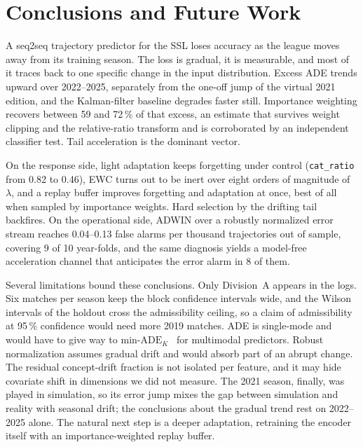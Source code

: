 \documentclass[conference]{IEEEtran}
\begin{document}
\section{Conclusions and Future Work}
\label{sec:conclusion}

A seq2seq trajectory predictor for the SSL loses accuracy as the league moves
away from its training season. The loss is gradual, it is measurable, and most
of it traces back to one specific change in the input distribution. Excess ADE
trends upward over 2022--2025, separately from the one-off jump of the virtual
2021 edition, and the Kalman-filter baseline degrades faster still. Importance
weighting recovers between 59 and 72\,\% of that excess, an estimate that
survives weight clipping and the relative-ratio transform and is corroborated
by an independent classifier test. Tail acceleration is the dominant vector.

On the response side, light adaptation keeps forgetting under control
(\texttt{cat\_ratio} from 0.82 to 0.46), EWC turns out to be inert over eight
orders of magnitude of $\lambda$, and a replay buffer improves forgetting and
adaptation at once, best of all when sampled by importance weights. Hard
selection by the drifting tail backfires. On the operational side, ADWIN over a
robustly normalized error stream reaches 0.04--0.13 false alarms per thousand
trajectories out of sample, covering 9 of 10 year-folds, and the same diagnosis
yields a model-free acceleration channel that anticipates the error alarm in 8
of them.

Several limitations bound these conclusions. Only Division~A appears in the
logs. Six matches per season keep the block confidence intervals wide, and the
Wilson intervals of the holdout cross the admissibility ceiling, so a claim of
admissibility at 95\,\% confidence would need more 2019 matches. ADE is
single-mode and would have to give way to
$\text{min-ADE}_K$~\cite{salzmann2020,yuan2021} for multimodal predictors.
Robust normalization assumes gradual drift and would absorb part of an abrupt
change. The residual concept-drift fraction is not isolated per feature, and it
may hide covariate shift in dimensions we did not measure. The 2021 season,
finally, was played in simulation, so its error jump mixes the gap between
simulation and reality with seasonal drift; the conclusions about the gradual
trend rest on 2022--2025 alone. The natural next step is a deeper adaptation,
retraining the encoder itself with an importance-weighted replay buffer.




\end{document}
